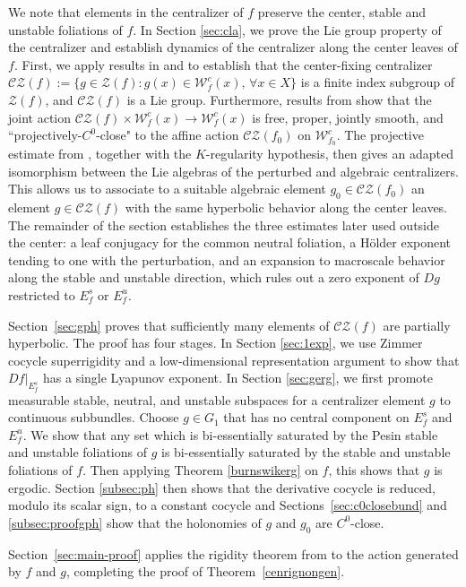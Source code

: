 \documentclass[11pt]{amsart}
\numberwithin{equation}{section}
\newcommand{\W}{\mathcal{W}}
\newcommand{\CZ}{\mathcal{CZ}}
\theoremstyle{plain}
\begin{document}
We note that elements in the centralizer of $f$ preserve the center, stable and unstable foliations of $f$.
In Section \ref{sec:cla}, we prove the Lie group property of the centralizer and establish dynamics of the centralizer along the center leaves of $f$. 
 First, we apply results in \cite{Witte} and \cite{Wang} to establish that the center-fixing centralizer $\CZ(f):=\{g\in \mathcal Z(f):g(x)\in \W^c_f(x), \, \forall x\in X\}$ is a finite index subgroup of $\mathcal Z(f)$, and $\CZ(f)$ is a Lie group. Furthermore, results from \cite{Wang26} show that the joint action $\CZ(f)\times \W^c_f(x)\to \W^c_f(x)$ is free, proper, jointly smooth, and ``projectively-$C^0$-close" to the affine action $\CZ(f_0)$ on $\W^c_{f_0}$. The projective estimate from \cite{Wang26}, together with the $K$-regularity hypothesis, then gives an adapted isomorphism between the
Lie algebras of the perturbed and algebraic centralizers. 
 This allows us to associate to a suitable algebraic element $g_0\in \CZ(f_0)$ an element
$g\in\CZ(f)$ with the same hyperbolic behavior along the center leaves.
The remainder of the section establishes the three estimates later used
outside the center: a leaf conjugacy for the common neutral foliation, a
H\"older exponent tending to one with the perturbation, and an expansion to macroscale behavior along the stable and unstable direction, which rules out a zero exponent of $Dg$ restricted to $E_f^s$ or $E_f^u$.


Section~\ref{sec:gph} proves that sufficiently many elements of $\CZ(f)$ are partially hyperbolic. The proof has
four stages. 
In Section \ref{sec:1exp}, we use Zimmer cocycle superrigidity and a low-dimensional
representation argument to show that $Df|_{E_f^s}$ has a single Lyapunov
exponent. 
In Section \ref{sec:gerg}, we first promote measurable stable, neutral, and
unstable subspaces for a centralizer element $g$ to continuous
subbundles. Choose $g\in G_1$ that has no central component on $E^s_f$ and $E^u_f$. We show that any set which is bi-essentially saturated by the Pesin stable and unstable foliations of $g$ is bi-essentially saturated by the stable and unstable foliations of $f$. Then applying Theorem \ref{burnswikerg} on $f$, this shows that $g$ is ergodic. 
Section \ref{subsec:ph} then shows that
the derivative cocycle is reduced, modulo its scalar sign, to a constant
cocycle and Sections~\ref{sec:c0closebund} and \ref{subsec:proofgph}  show that the holonomies of $g$ and $g_0$ are $C^0$-close.

Section~\ref{sec:main-proof} applies the rigidity theorem from \cite{Wang26} to
the action generated by $f$ and $g$, completing the proof of
Theorem~\ref{cenrignongen}. 
\end{document}
